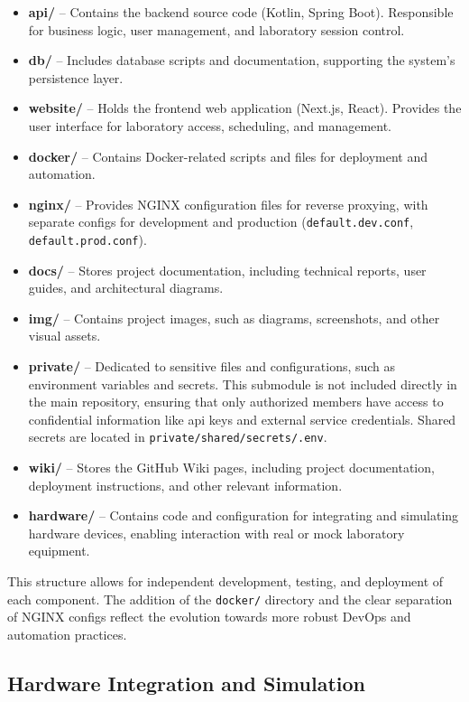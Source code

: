 \begin{itemize}
    \item \textbf{api/} – Contains the backend source code (Kotlin, Spring Boot). Responsible for business logic, user management, and laboratory session control.
    \item \textbf{db/} – Includes database scripts and documentation, supporting the system's persistence layer.
    \item \textbf{website/} – Holds the frontend web application (Next.js, React). Provides the user interface for laboratory access, scheduling, and management.
    \item \textbf{docker/} – Contains Docker-related scripts and files for deployment and automation.
    \item \textbf{nginx/} – Provides NGINX configuration files for reverse proxying, with separate configs for development and production (\texttt{default.dev.conf}, \texttt{default.prod.conf}).
    \item \textbf{docs/} – Stores project documentation, including technical reports, user guides, and architectural diagrams.
    \item \textbf{img/} – Contains project images, such as diagrams, screenshots, and other visual assets.
    \item \textbf{private/} – Dedicated to sensitive files and configurations, such as environment variables and secrets. This submodule is not included directly in the main repository, ensuring that only authorized members have access to confidential information like \ac{api} keys and external service credentials. Shared secrets are located in \texttt{private/shared/secrets/.env}.
    \item \textbf{wiki/} – Stores the GitHub Wiki pages, including project documentation, deployment instructions, and other relevant information.
    \item \textbf{hardware/} – Contains code and configuration for integrating and simulating hardware devices, enabling interaction with real or mock laboratory equipment.
\end{itemize}

This structure allows for independent development, testing, and deployment of each component. The addition of the \texttt{docker/} directory and the clear separation of NGINX configs reflect the evolution towards more robust DevOps and automation practices.

\subsection{Hardware Integration and Simulation} \label{subsec:hardware}

